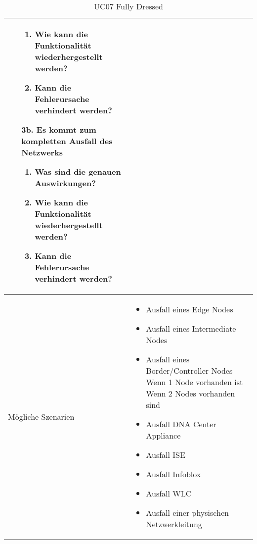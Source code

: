 \begin{table}[H]
\begin{tabularx}{\textwidth}{l | X}
\begin{itemize}
\begin{enumerate}
				\item Wie kann die Funktionalität wiederhergestellt werden?
				\item Kann die Fehlerursache verhindert werden?
			\end{enumerate}
			\item[3b.]  Es kommt zum kompletten Ausfall des Netzwerks
			\begin{enumerate}
				\item Was sind die genauen Auswirkungen?
				\item Wie kann die Funktionalität wiederhergestellt werden?
				\item Kann die Fehlerursache verhindert werden?
			\end{enumerate}
		\end{itemize}
		\\
		\hline
		Mögliche Szenarien  & 
		\begin{itemize}
			\item Ausfall eines Edge Nodes
			\item Ausfall eines Intermediate Nodes
			\item Ausfall eines Border/Controller Nodes
			\subitem Wenn 1 Node vorhanden ist
			\subitem Wenn 2 Nodes vorhanden sind
			\item Ausfall DNA Center Appliance
			\item Ausfall ISE
			\item Ausfall Infoblox
			\item Ausfall WLC
			\item Ausfall einer physischen Netzwerkleitung
		\end{itemize}
	\end{tabularx}
	\caption{UC07 Fully Dressed}
	\label{tab:UC07}
\end{table}

